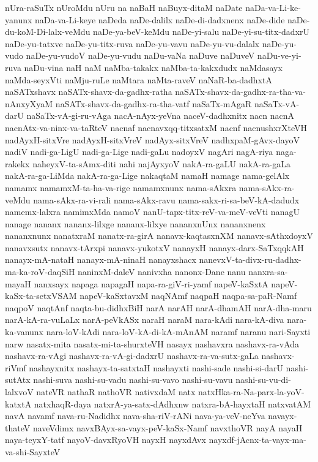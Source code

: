 {nUra-raSuTx
nUroMdu
nUru
na
naBaH
naBuyx-ditaM
naDate
naDa-va-Li-ke-yanunx
naDa-va-Li-keye
naDeda
naDe-dalilx
naDe-di-dadxnenx
naDe-dide
naDe-du-koM-Di-lalx-veMdu
naDe-ya-beV-keMdu
naDe-yi-salu
naDe-yi-su-titx-dadxrU
naDe-yu-tatxve
naDe-yu-titx-ruva
naDe-yu-vavu
naDe-yu-vu-dalalx
naDe-yu-vudo
naDe-yu-vudoV
naDe-yu-vudu
naDu-vaNa
naDuve
naDuveV
naDu-ve-yi-ruva
naDu-vina
naH
naM
naMba-takakx
naMba-ta-kakxdudx
naMdasayx
naMda-seyxVti
naMju-ruLe
naMtara
naMta-raveV
naNaR-ba-dadhxtA
naSATxshavx
naSATx-shavx-da-gadhx-ratha
naSATx-shavx-da-gadhx-ra-tha-va-nAnxyXyaM
naSATx-shavx-da-gadhx-ra-tha-vatf
naSaTx-mAgaR
naSaTx-vA-darU
naSaTx-vA-gi-ru-vAga
nacA-nAyx-yeVna
naceV-dadhxnitx
nacn
nacnA
nacnAtx-va-ninx-va-taRteV
nacnaf
nacnavxqq-titxsatxM
nacnf
nacnushxrXteVH
nadAyxH-sitxVre
nadAyxH-sitxVreV
nadAyx-sitxVreV
nadhxpaM-gAvx-dayoV
nadiV
nadi-ga-LigU
nadi-ga-Lige
nadi-gaLu
nadoyxV
nagAri
nagA-riya
naga-rakekx
naheyxV-ta-sAmx-diti
nahi
najAyxyoV
nakA-ra-gaLU
nakA-ra-gaLa
nakA-ra-ga-LiMda
nakA-ra-ga-Lige
nakaqtaM
namaH
namage
nama-gelAlx
namamx
namamxM-ta-ha-va-rige
namamxnunx
nama-sAkxra
nama-sAkx-ra-veMdu
nama-sAkx-ra-vi-rali
nama-sAkx-ravu
nama-sakx-ri-sa-beV-kA-dadudx
namemx-lalxra
namimxMda
namoV
nanU-tapx-titx-reV-va-meV-veVti
nanagU
nanage
nananx
nananx-lilxge
nananx-lilxye
nananxnUnx
nananxnenx
nananxnunx
nanatxraM
nanatx-ra-girA
nanavx-kaqtasxnXM
nanavx-sAthxdoyxV
nanavxsutx
nanavx-tArxpi
nanavx-yukotxV
nanayxH
nanayx-darx-SaTxqqkAH
nanayx-mA-nataH
nanayx-mA-ninaH
nanayxshacx
nanevxV-ta-divx-ru-dadhx-ma-ka-roV-daqSiH
naninxM-daleV
nanivxha
nanonx-Dane
nanu
nanxra-sa-mayaH
nanxsayx
napaga
napagaH
napa-ra-giV-ri-yamf
napeV-kaSxtA
napeV-kaSx-ta-setxVSAM
napeV-kaSxtavxM
naqNAmf
naqpaH
naqpa-sa-paR-Namf
naqpoV
naqtAnf
naqta-bu-didhxBiH
narA
narAH
narA-dhamAH
narA-dha-maru
narA-kA-ra-vuLaLx
narA-peVkASx
naraH
naraM
nara-kAdi
nara-kA-diva
nara-ka-vanunx
nara-loV-kAdi
nara-loV-kA-di-kA-mAnAM
naramf
naranu
nari-Sayxti
narw
nasatx-mita
nasatx-mi-ta-shurxteVH
nasayx
nashavxra
nashavx-ra-vAda
nashavx-ra-vAgi
nashavx-ra-vA-gi-dadxrU
nashavx-ra-va-sutx-gaLa
nashavx-riVmf
nashayxnitx
nashayx-ta-satxtaH
nashayxti
nashi-sade
nashi-si-darU
nashi-sutAtx
nashi-suva
nashi-su-vadu
nashi-su-vavo
nashi-su-vavu
nashi-su-vu-di-lalxvoV
nateVR
nathaR
nathoVR
nativxdaM
natx
natxHka-ra-Na-parx-la-yoV-katxtA
natxhaqR-daya
natxrA-ya-satx-dAdhxnw
natxra-bA-hayxtaH
natxvatAM
navA
navamf
nava-ru-Nadidhx
nava-sha-riV-rANi
nava-ya-veV-neYva
navayx-thateV
naveVdimx
navxBAyx-sa-vayx-peV-kaSx-Namf
navxthoVR
nayA
nayaH
naya-teyxY-tatf
nayoV-davxRyoVH
nayxH
nayxdAvx
nayxdf-jAcnx-ta-vayx-ma-va-shi-SayxteV
}
